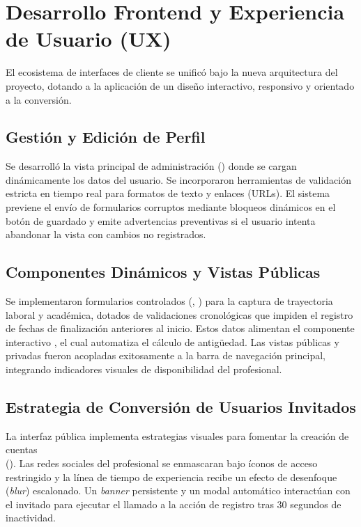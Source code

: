 \section{Desarrollo Frontend y Experiencia de Usuario (UX)}
\label{sec:frontend}

El ecosistema de interfaces de cliente se unificó bajo la nueva arquitectura del proyecto, dotando a la aplicación de un diseño interactivo, responsivo y orientado a la conversión.

\subsection{Gestión y Edición de Perfil}
Se desarrolló la vista principal de administración () donde se cargan dinámicamente los datos del usuario. Se incorporaron herramientas de validación estricta en tiempo real para formatos de texto y enlaces (URLs). El sistema previene el envío de formularios corruptos mediante bloqueos dinámicos en el botón de guardado y emite advertencias preventivas si el usuario intenta abandonar la vista con cambios no registrados.

\subsection{Componentes Dinámicos y Vistas Públicas}
Se implementaron formularios controlados (, ) para la captura de trayectoria laboral y académica, dotados de validaciones cronológicas que impiden el registro de fechas de finalización anteriores al inicio. Estos datos alimentan el componente interactivo , el cual automatiza el cálculo de antigüedad. Las vistas públicas y privadas fueron acopladas exitosamente a la barra de navegación principal, integrando indicadores visuales de disponibilidad del profesional.

\subsection{Estrategia de Conversión de Usuarios Invitados}
La interfaz pública implementa estrategias visuales para fomentar la creación de cuentas \\(). Las redes sociales del profesional se enmascaran bajo íconos de acceso restringido y la línea de tiempo de experiencia recibe un efecto de desenfoque (\textit{blur}) escalonado. Un \textit{banner} persistente y un modal automático interactúan con el invitado para ejecutar el llamado a la acción de registro tras 30 segundos de inactividad.

